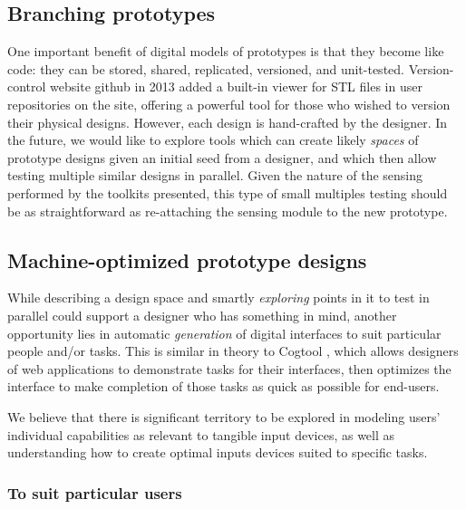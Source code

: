 \subsection{Branching prototypes}

One important benefit of digital models of prototypes is that they become like code: they can be stored, shared, replicated, versioned, and unit-tested. Version-control website github \cite{github} in 2013 added a built-in viewer for STL files in user repositories on the site, offering a powerful tool for those who wished to version their physical designs. However, each design is hand-crafted by the designer. In the future, we would like to explore tools which can create likely \emph{spaces} of prototype designs given an initial seed from a designer, and which then allow testing multiple similar designs in parallel. Given the nature of the sensing performed by the toolkits presented, this type of small multiples testing should be as straightforward as re-attaching the sensing module to the new prototype.

\subsection{Machine-optimized prototype designs}

While describing a design space and smartly \emph{exploring} points in it to test in parallel could support a designer who has something in mind, another opportunity lies in automatic \emph{generation} of digital interfaces to suit particular people and/or tasks. This is similar in theory to Cogtool \cite{john-cogtool}, which allows designers of web applications to demonstrate tasks for their interfaces, then optimizes the interface to make completion of those tasks as quick as possible for end-users.

We believe that there is significant territory to be explored in modeling users' individual capabilities as relevant to tangible input devices, as well as understanding how to create optimal inputs devices suited to specific tasks.

    \subsubsection{To suit particular users}

